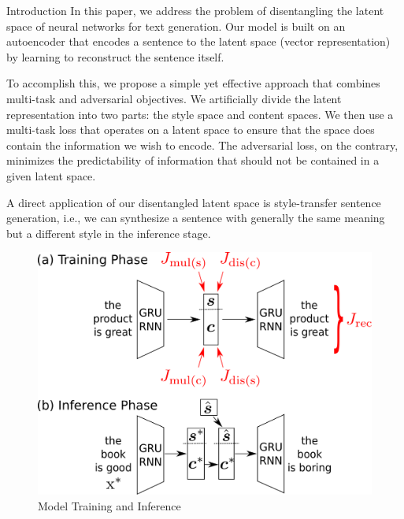 \documentclass[final]{beamer}
\newlength{\onecolwid}
\begin{document}
\begin{frame}[t]
\begin{columns}[t]
\begin{column}{\onecolwid}
\begin{block}{Introduction}
                In this paper, we address the problem of disentangling the latent space of neural networks for text generation.
                Our model is built on an autoencoder that encodes a sentence to the latent space (vector representation) by learning to reconstruct the sentence itself.

                To accomplish this, we propose a simple yet effective approach that combines multi-task and adversarial objectives.
                We artificially divide the latent representation into two parts: the style space and content spaces.
                We then use a multi-task loss that operates on a latent space to ensure that the space does contain the information we wish to encode.
                The adversarial loss, on the contrary, minimizes the predictability of information that should not be contained in a given latent space.

                A direct application of our disentangled latent space is style-transfer sentence generation, i.e., we can synthesize a sentence with generally the same meaning but a different style in the inference stage.

            \end{block}


            \begin{figure}
                \includegraphics[width=1\linewidth]{model-overview}
                \caption{Model Training and Inference}
                \label{fig:model-overview}
            \end{figure}


\end{column}
\end{columns}
\end{frame}
\end{document}
